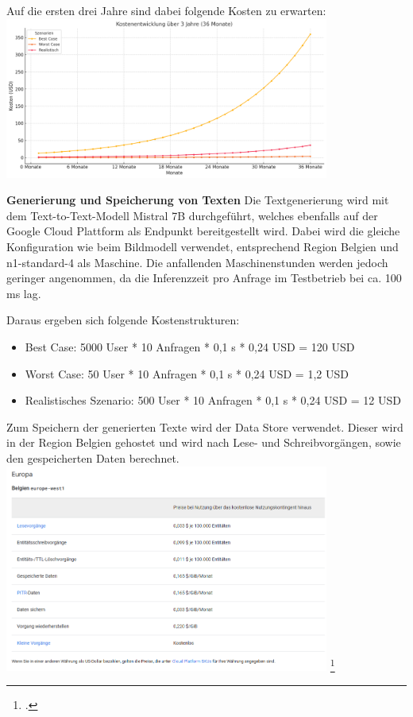 Auf die ersten drei Jahre sind dabei folgende Kosten zu erwarten:
\includegraphics[width=0.8\textwidth]{abbildungen/KostenSpeicher}

\textbf{Generierung und Speicherung von Texten}\newline
Die Textgenerierung wird mit dem Text-to-Text-Modell Mistral 7B durchgeführt, welches ebenfalls auf der Google Cloud Plattform als Endpunkt bereitgestellt wird.
Dabei wird die gleiche Konfiguration wie beim Bildmodell verwendet, entsprechend Region Belgien und n1-standard-4 als Maschine.
Die anfallenden Maschinenstunden werden jedoch geringer angenommen, da die Inferenzzeit pro Anfrage im Testbetrieb bei ca. 100 ms lag.

Daraus ergeben sich folgende Kostenstrukturen:
\begin{itemize}
    \item Best Case: 5000 User * 10 Anfragen * 0,1 s * 0,24 USD = 120 USD
    \item Worst Case: 50 User * 10 Anfragen * 0,1 s * 0,24 USD = 1,2 USD
    \item Realistisches Szenario: 500 User * 10 Anfragen * 0,1 s * 0,24 USD = 12 USD
\end{itemize}

Zum Speichern der generierten Texte wird der Data Store verwendet.
Dieser wird in der Region Belgien gehostet und wird nach Lese- und Schreibvorgängen, sowie den gespeicherten Daten berechnet.
\includegraphics[width=0.8\textwidth]{abbildungen/kostendatastore}
\footcite{GoogleDatastorePricing2025}

